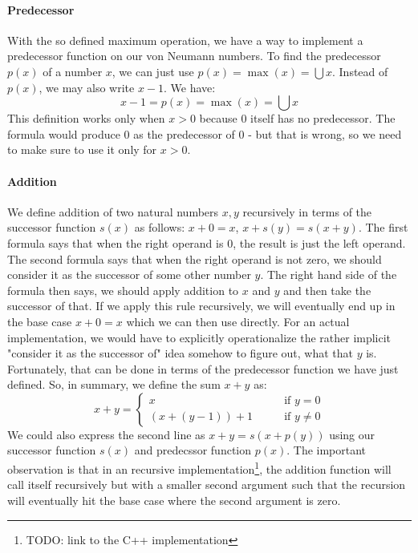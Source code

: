 \paragraph{Predecessor}
With the so defined maximum operation, we have a way to implement a predecessor function on our von Neumann numbers. To find the predecessor $p(x)$ of a number $x$, we can just use $p(x) = \max(x) = \bigcup x$. Instead of $p(x)$, we may also write $x-1$. We have:
\begin{equation}
x - 1 = p(x) = \max(x) = \bigcup x
\end{equation}
This definition works only when $x > 0$ because $0$ itself has no predecessor. The formula would produce $0$ as the predecessor of $0$ - but that is wrong, so we need to make sure to use it only for $x > 0$.

\paragraph{Addition}
We define addition of two natural numbers $x,y$ recursively in terms of the successor function $s(x)$ as follows: $x + 0 = x$, $x + s(y) = s(x + y)$. The first formula says that when the right operand is $0$, the result is just the left operand. The second formula says that when the right operand is not zero, we should consider it as the successor of some other number $y$. The right hand side of the formula then says, we should apply addition to $x$ and $y$ and then take the successor of that. If we apply this rule recursively, we will eventually end up in the base case $x + 0 = x$ which we can then use directly. For an actual implementation, we would have to explicitly operationalize the rather implicit "consider it as the successor of" idea somehow to figure out, what that $y$ is. Fortunately, that can be done in terms of the predecessor function we have just defined. So, in summary, we define the sum $x+y$ as:
\begin{equation}
x+y =\begin{cases}
 x            & \qquad \text{if } y   =  0 \\
 (x+(y-1))+1  & \qquad \text{if } y \neq 0 
\end{cases}
\end{equation}
We could also express the second line as $x + y = s(x + p(y))$ using our successor function $s(x)$ and predecssor function $p(x)$. The important observation is that in an recursive implementation\footnote{TODO: link to the C++ implementation}, the addition function will call itself recursively but with a smaller second argument such that the recursion will eventually hit the base case where the second argument is zero.

